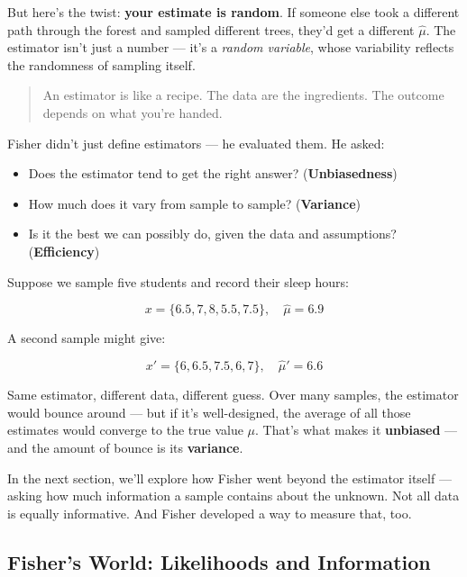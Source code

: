 But here’s the twist: \textbf{your estimate is random}. If someone else took a different path through the forest and sampled different trees, they’d get a different \( \hat{\mu} \). The estimator isn’t just a number — it’s a \textit{random variable}, whose variability reflects the randomness of sampling itself.

\begin{quote}
An estimator is like a recipe. The data are the ingredients. The outcome depends on what you’re handed.
\end{quote}

Fisher didn’t just define estimators — he evaluated them. He asked:

\begin{itemize}
    \item Does the estimator tend to get the right answer? (\textbf{Unbiasedness})
    \item How much does it vary from sample to sample? (\textbf{Variance})
    \item Is it the best we can possibly do, given the data and assumptions? (\textbf{Efficiency})
\end{itemize}

\begin{example}
Suppose we sample five students and record their sleep hours:

\[
x = \{6.5, 7, 8, 5.5, 7.5\}, \quad \hat{\mu} = 6.9
\]

A second sample might give:

\[
x' = \{6, 6.5, 7.5, 6, 7\}, \quad \hat{\mu}' = 6.6
\]

Same estimator, different data, different guess. Over many samples, the estimator would bounce around — but if it’s well-designed, the average of all those estimates would converge to the true value \( \mu \). That’s what makes it \textbf{unbiased} — and the amount of bounce is its \textbf{variance}.
\end{example}

\medskip

In the next section, we’ll explore how Fisher went beyond the estimator itself — asking how much information a sample contains about the unknown. Not all data is equally informative. And Fisher developed a way to measure that, too.




\subsection{Fisher’s World: Likelihoods and Information}

